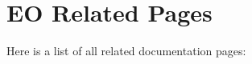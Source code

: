 \section{EO Related Pages}
Here is a list of all related documentation pages:\begin{CompactList}
\item {}

\item {}

\item {}

\end{CompactList}
